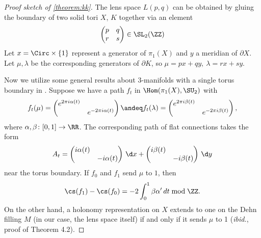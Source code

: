 \begin{proof}[Proof sketch of \cref{theorem:kk}]
  The lens space $L(p,q)$ can be obtained by gluing the boundary of two solid tori $X$, $K$ together via an element
  \begin{equation*}
    \begin{pmatrix}
      p&q \\
      r&s 
  \end{pmatrix}\in \SL_2(\ZZ)
  \end{equation*}
  Let $x=\Circ\times\{1\}$ represent a generator of $\pi_1(X)$ and $y$ a meridian of $\partial X$. Let $\mu, \lambda$ be the corresponding generators of $\partial K$, so $\mu=px+qy,\ \lambda=rx+sy$. 

  Now we utilize some general results about $3$-manifolds with a single torus boundary in \cite{KK}. 
  Suppose we have a path $f _t$ in $\Hom(\pi_1(X),\SU_2)$ with 
  \begin{equation*}
    f _t(\mu) =
    \begin{pmatrix}
      e^{2\pi i\alpha(t)}& \\
      &e^{-2\pi i\alpha(t)} 
    \end{pmatrix} 
    \andeq
    f _t(\lambda) =
    \begin{pmatrix}
      e^{2\pi i\beta(t)}& \\
      &e^{-2\pi i\beta(t)} 
    \end{pmatrix},
  \end{equation*}
  where $\alpha, \beta \colon [0,1] \rightarrow\RR$. 
  The corresponding path of flat connections takes the form
  \begin{equation*}
  A_t=\begin{pmatrix}
     i\alpha(t)& \\
      &-i\alpha(t) 
  \end{pmatrix}\, \d x+ \begin{pmatrix}
      i\beta(t)& \\
      &-i\beta(t) 
  \end{pmatrix}\, \d y
  \end{equation*}
  near the torus boundary. 
  If $f _0 $ and $ f _1$ send $\mu$ to $1$,
  then \cite[Theorem 4.2]{KK}
  \begin{equation}
  	\cs(f _1)-\cs(f _0)=-2\int_0^1\beta\alpha'\, dt \bmod \ZZ.
  \end{equation}
  On the other hand, a holonomy representation on $X$ extends to one on the Dehn filling $M$ (in our case, the lens
  space itself) if and only if it sends $\mu$ to 1 (\textit{ibid.}, proof of Theorem 4.2).


\end{proof}
